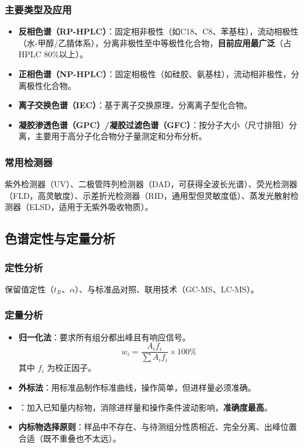 \documentclass[11pt,a4paper]{article}
\newcommand{\keydef}[1]{\tcbox[on line, colback=lightPink!50,, colframe=subsectionColor!70, boxsep=2pt, arc=2pt]{\textbf{#1}}}
\begin{document}
\subsubsection{主要类型及应用}
\begin{itemize}
    \item \textbf{反相色谱（RP-HPLC）}：固定相非极性（如C18、C8、苯基柱），流动相极性（水-甲醇/乙腈体系），分离非极性至中等极性化合物，\textbf{目前应用最广泛}（占HPLC 80\%以上）。
    \item \textbf{正相色谱（NP-HPLC）}：固定相极性（如硅胶、氨基柱），流动相非极性，分离极性化合物。
    \item \textbf{离子交换色谱（IEC）}：基于离子交换原理，分离离子型化合物。
    \item \textbf{凝胶渗透色谱（GPC）/凝胶过滤色谱（GFC）}：按分子大小（尺寸排阻）分离，主要用于高分子化合物分子量测定和分布分析。
\end{itemize}

\subsubsection{常用检测器}
紫外检测器（UV）、二极管阵列检测器（DAD，可获得全波长光谱）、荧光检测器（FLD，高灵敏度）、示差折光检测器（RID，通用型但灵敏度低）、蒸发光散射检测器（ELSD，适用于无紫外吸收物质）。

\subsection{色谱定性与定量分析}

\subsubsection{定性分析}
保留值定性（\( t_R \)、\( \alpha \)）、与标准品对照、联用技术（GC-MS、LC-MS）。

\subsubsection{定量分析}
\begin{itemize}
    \item \textbf{归一化法}：要求所有组分都出峰且有响应信号。
    \[
    \boxed{w_i = \frac{A_i f_i}{\sum A_i f_i} \times 100\%}
    \]
    其中 \( f_i \) 为校正因子。
    \item \textbf{外标法}：用标准品制作标准曲线，操作简单，但进样量必须准确。
    \item \keydef{\textbf{内标法}}：加入已知量内标物，消除进样量和操作条件波动影响，\textbf{准确度最高}。
    \item \textbf{内标物选择原则}：样品中不存在、与待测组分性质相近、完全分离、出峰位置合适（既不重叠也不太远）。
\end{itemize}
\end{document}
